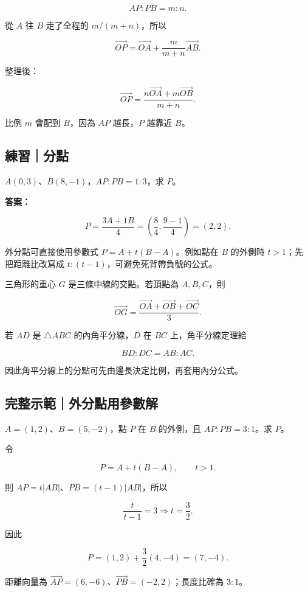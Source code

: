 \documentclass[11pt,a4paper]{article}
\begin{document}
\[
AP:PB=m:n.
\]

從 \(A\) 往 \(B\) 走了全程的 \(m/(m+n)\)，所以

\[
\overrightarrow{OP}
=\overrightarrow{OA}
+\frac{m}{m+n}\overrightarrow{AB}.
\]

整理後：

\[
\boxed{
\overrightarrow{OP}
=\frac{n\overrightarrow{OA}+m\overrightarrow{OB}}{m+n}
}.
\]

比例 \(m\) 會配到 \(B\)，因為 \(AP\) 越長，\(P\) 越靠近 \(B\)。

\begin{HandoutSelfCheck}

\subsection{練習｜分點}\label{ux7df4ux7fd2ux5206ux9ede}

\(A(0,3)\)、\(B(8,-1)\)，\(AP:PB=1:3\)，求 \(P\)。

\textbf{答案：}

\[
P=\frac{3A+1B}{4}
=\left(\frac{8}{4},\frac{9-1}{4}\right)
=\boxed{(2,2)}.
\]

\end{HandoutSelfCheck}

外分點可直接使用參數式 \(P=A+t(B-A)\)。例如點在 \(B\) 的外側時 \(t>1\)；先把距離比改寫成 \(t:(t-1)\)，可避免死背帶負號的公式。

三角形的重心 \(G\) 是三條中線的交點。若頂點為 \(A,B,C\)，則

\[
\boxed{
\overrightarrow{OG}
=\frac{\overrightarrow{OA}+\overrightarrow{OB}+\overrightarrow{OC}}{3}
}.
\]

若 \(AD\) 是 \(\triangle ABC\) 的內角平分線，\(D\) 在 \(BC\) 上，角平分線定理給

\[
BD:DC=AB:AC.
\]

因此角平分線上的分點可先由邊長決定比例，再套用內分公式。

\begin{HandoutWorkedExample}

\subsection{完整示範｜外分點用參數解}\label{ux5b8cux6574ux793aux7bc4ux5916ux5206ux9edeux7528ux53c3ux6578ux89e3}

\(A=(1,2)\)、\(B=(5,-2)\)，點 \(P\) 在 \(B\) 的外側，且 \(AP:PB=3:1\)。求 \(P\)。

令

\[
P=A+t(B-A),
\qquad t>1.
\]

則 \(AP=t|AB|\)、\(PB=(t-1)|AB|\)，所以

\[
\frac{t}{t-1}=3
\Longrightarrow
t=\frac32.
\]

因此

\[
P=(1,2)+\frac32(4,-4)
=\boxed{(7,-4)}.
\]

距離向量為 \(\overrightarrow{AP}=(6,-6)\)、\(\overrightarrow{PB}=(-2,2)\)；長度比確為 \(3:1\)。

\end{HandoutWorkedExample}
\end{document}
